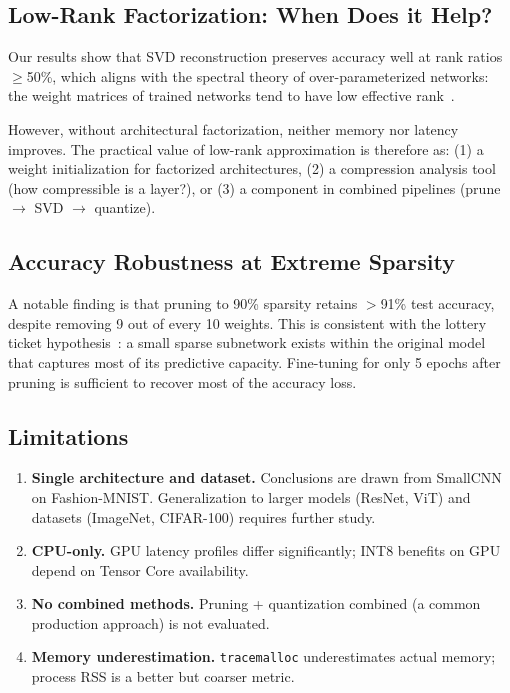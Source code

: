 \subsection{Low-Rank Factorization: When Does it Help?}

Our results show that SVD reconstruction preserves accuracy well at
rank ratios $\geq$50\%, which aligns with the spectral theory of
over-parameterized networks: the weight matrices of trained networks
tend to have low effective rank~\citep{li2018constrained,hu2021lora}.

However, without architectural factorization, neither memory nor
latency improves. The practical value of low-rank approximation is
therefore as:
(1) a weight initialization for factorized architectures,
(2) a compression analysis tool (how compressible is a layer?), or
(3) a component in combined pipelines (prune $\to$ SVD $\to$ quantize).

\subsection{Accuracy Robustness at Extreme Sparsity}

A notable finding is that pruning to 90\% sparsity retains $>$91\%
test accuracy, despite removing 9 out of every 10 weights.
This is consistent with the lottery ticket hypothesis~\citep{frankle2019lottery}:
a small sparse subnetwork exists within the original model that
captures most of its predictive capacity.
Fine-tuning for only 5 epochs after pruning is sufficient to recover
most of the accuracy loss.

\subsection{Limitations}

\begin{enumerate}[leftmargin=2em,topsep=2pt]
  \item \textbf{Single architecture and dataset.} Conclusions are drawn
    from SmallCNN on Fashion-MNIST. Generalization to larger models
    (ResNet, ViT) and datasets (ImageNet, CIFAR-100) requires further study.
  \item \textbf{CPU-only.} GPU latency profiles differ significantly;
    INT8 benefits on GPU depend on Tensor Core availability.
  \item \textbf{No combined methods.} Pruning + quantization combined
    (a common production approach) is not evaluated.
  \item \textbf{Memory underestimation.} \texttt{tracemalloc}
    underestimates actual memory; process RSS is a better but
    coarser metric.
\end{enumerate}
